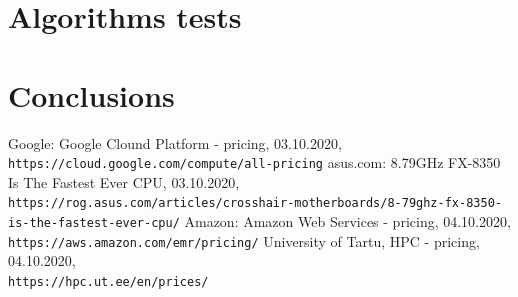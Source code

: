 \documentclass{article}
\begin{document}
	\section{Algorithms tests}
	\section{Conclusions}
	
	\begin{thebibliography}{9}
		Google: Google Clound Platform - pricing, 03.10.2020,
		\\\texttt{https://cloud.google.com/compute/all-pricing}
		asus.com: 8.79GHz FX-8350 Is The Fastest Ever CPU, 03.10.2020,
		\\\texttt{https://rog.asus.com/articles/crosshair-motherboards/8-79ghz-fx-8350-is-the-fastest-ever-cpu/}
		Amazon: Amazon Web Services - pricing, 04.10.2020,
		\\\texttt{https://aws.amazon.com/emr/pricing/}
		University of Tartu, HPC - pricing, 04.10.2020,
		\\\texttt{https://hpc.ut.ee/en/prices/}
	\end{thebibliography}
\end{document}
